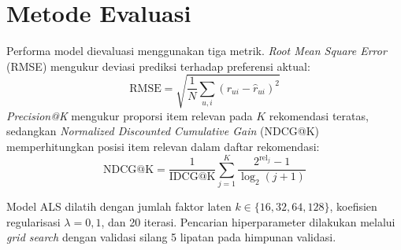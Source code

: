 \section{Metode Evaluasi}
Performa model dievaluasi menggunakan tiga metrik. \emph{Root Mean Square
Error} (RMSE) mengukur deviasi prediksi terhadap preferensi aktual:
\begin{equation}
\text{RMSE} = \sqrt{\frac{1}{N}\sum_{u,i}\left(r_{ui} -
\hat{r}_{ui}\right)^2}
\label{eq:rmse}
\end{equation}
\emph{Precision@K} mengukur proporsi item relevan pada $K$ rekomendasi
teratas, sedangkan \emph{Normalized Discounted Cumulative Gain} (NDCG@K)
memperhitungkan posisi item relevan dalam daftar rekomendasi:
\begin{equation}
\text{NDCG@K} = \frac{1}{\text{IDCG@K}} \sum_{j=1}^{K}
\frac{2^{\text{rel}_j} - 1}{\log_2(j+1)}
\label{eq:ndcg}
\end{equation}

\begin{tcolorbox}[infobox, title={\faCogs\ Konfigurasi Eksperimen}]
Model ALS dilatih dengan jumlah faktor laten $k \in \{16, 32, 64, 128\}$,
koefisien regularisasi $\lambda = 0{,}1$, dan 20 iterasi. Pencarian
hiperparameter dilakukan melalui \emph{grid search} dengan validasi silang
5 lipatan pada himpunan validasi.
\end{tcolorbox}

